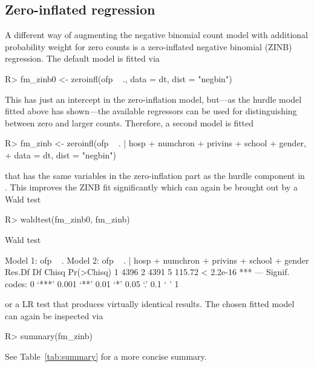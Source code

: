 \documentclass{Z}
\begin{document}
\subsection{Zero-inflated regression}

A different way of augmenting the negative binomial count model 
with additional probability weight for zero counts is a zero-inflated
negative binomial (ZINB) regression. The default model is fitted via
\begin{Schunk}
\begin{Sinput}
R> fm_zinb0 <- zeroinfl(ofp ~ ., data = dt, dist = "negbin")
\end{Sinput}
\end{Schunk}
This has just an intercept in the zero-inflation model, but---as the hurdle
model  fitted above has shown---the available regressors can be
used for distinguishing between zero and larger counts. Therefore, a second
model is fitted
\begin{Schunk}
\begin{Sinput}
R> fm_zinb <- zeroinfl(ofp ~ . | hosp + numchron + privins + school + gender,
+   data = dt, dist = "negbin")
\end{Sinput}
\end{Schunk}
that has the same variables in the zero-inflation part as the hurdle
component in . This improves the ZINB fit significantly
which can again be brought out by a Wald test
\begin{Schunk}
\begin{Sinput}
R> waldtest(fm_zinb0, fm_zinb)
\end{Sinput}
\begin{Soutput}
Wald test

Model 1: ofp ~ .
Model 2: ofp ~ . | hosp + numchron + privins + school + gender
  Res.Df   Df  Chisq Pr(>Chisq)    
1   4396                           
2   4391    5 115.72  < 2.2e-16 ***
---
Signif. codes:  0 ‘***’ 0.001 ‘**’ 0.01 ‘*’ 0.05 ‘.’ 0.1 ‘ ’ 1 
\end{Soutput}
\end{Schunk}
or a LR test  that produces virtually identical
results. The chosen fitted model can again be inspected via
\begin{Schunk}
\begin{Sinput}
R> summary(fm_zinb)
\end{Sinput}
\end{Schunk}
See Table~\ref{tab:summary} for a more concise summary.
\end{document}
